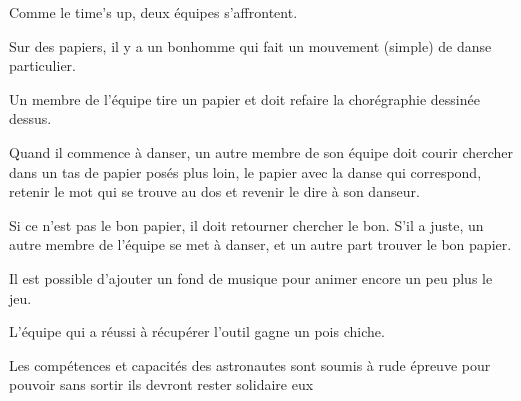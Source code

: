 \documentclass{grand-jeu}
\begin{document}
\begin{liste-materiel}
\end{liste-materiel}

\begin{regles}
Comme le time’s up, deux équipes s'affrontent.

Sur des papiers, il y a un bonhomme qui fait un mouvement (simple) de danse particulier.

Un membre de l’équipe tire un papier et doit refaire la chorégraphie dessinée dessus.

Quand il commence à danser, un autre membre de son équipe doit courir chercher dans un tas de papier posés plus loin, le papier avec la danse qui correspond, retenir le mot qui se trouve au dos et revenir le dire à son danseur.

Si ce n’est pas le bon papier, il doit retourner chercher le bon. S’il a juste, un autre membre de l’équipe se met à danser, et un autre part trouver le bon papier.

Il est possible d’ajouter un fond de musique pour animer encore un peu plus le jeu.

L’équipe qui a réussi à récupérer l’outil gagne un pois chiche.
\end{regles}

\begin{imaginaire}
Les compétences et capacités des astronautes sont soumis à rude épreuve pour pouvoir sans sortir ils devront rester solidaire eux 
\end{imaginaire}

\begin{moments-stop}
\end{moments-stop}
\end{document}
